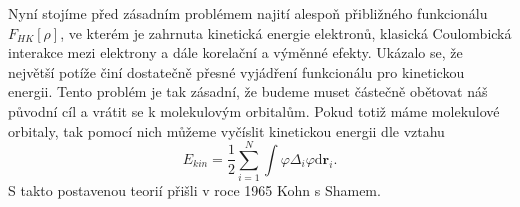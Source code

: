 Nyní stojíme před zásadním problémem najití alespoň přibližného funkcionálu $F_{HK}[\rho]$, ve kterém je zahrnuta kinetická energie elektronů, klasická Coulombická interakce mezi elektrony a dále korelační a výměnné efekty. 
Ukázalo se, že největší potíže činí dostatečně přesné vyjádření funkcionálu pro kinetickou energii.
Tento problém je tak zásadní, že budeme muset částečně obětovat náš původní cíl a vrátit se k molekulovým orbitalům.
Pokud totiž máme molekulové orbitaly, tak pomocí nich můžeme vyčíslit kinetickou energii dle vztahu
\begin{equation}
E_{kin}=\frac{1}{2} \sum_{i=1}^N \int \varphi \Delta_i \varphi \mathrm{d}\textbf{r}_i .
\end{equation}
S takto postavenou teorií přišli v roce 1965 Kohn s Shamem.

